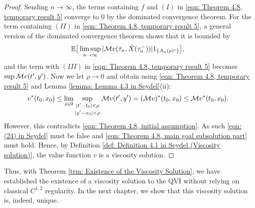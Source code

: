 \begin{proof}
    Sending $n \rightarrow \infty$, the terms containing $f$ and $(I)$ in \eqref{eqn: Theorem 4.8, temporary result 5} converge to 0 by the dominated convergence theorem. For the term containing $(II)$ in \eqref{eqn: Theorem 4.8, temporary result 5}, a general version of the dominated convergence theorem shows that it is bounded by 
    \begin{equation*}
        \mathbb{E} \big[ \limsup_{n \rightarrow \infty} |\mathcal{M} v (\bar \tau_n, \check X(\tau_n^-))| 1_{\left\{A_n(\rho)^c\right\}} \big], 
    \end{equation*}
    and the term with $(III)$ in \eqref{eqn: Theorem 4.8, temporary result 5} becomes $\sup \mathcal{M} v(t',y')$. Now we let $\rho \rightarrow 0$ and obtain using \eqref{eqn: Theorem 4.8, temporary result 5} and Lemma \ref{lemma: Lemma 4.3 in Seydel}(ii):
    \begin{equation*}
        v^*(t_0,x_0) \leq \lim_{\rho \downarrow 0} \sup_{\substack{|t' - t_0| < \rho \\[2pt] |y' - x_0| < \rho}} \mathcal{M} v(t',y') = (\mathcal{M} v)^* (t_0,x_0) \leq \mathcal{M} v^*(t_0,x_0).
    \end{equation*}
    However, this contradicts \eqref{eqn: Theorem 4.8, initial assumption}. As such \eqref{eqn: (24) in Seydel} must be false and \eqref{eqn: Theorem 4.8, main goal subsolution part} must hold. Hence, by Definition \ref{def: Definition 4.1 in Seydel (Viscosity solution)}, the value function $v$ is a viscosity solution.
\end{proof}

Thus, with Theorem \ref{trm: Existence of the Viscosity Solution}, we have established the existence of a viscosity solution to the QVI without relying on classical $C^{1,2}$ regularity. In the next chapter, we show that this viscosity solution is, indeed, unique. 